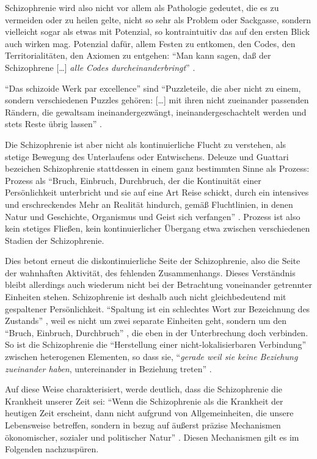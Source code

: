 \documentclass[12pt,
               DIV13,
               paper=a4,
               twoside=false,
               onehalfspacing,
               bibliography=totoc,
               toc=graduated,
               draft,
               ]{scrartcl}
\newcommand{\lips}{\dots\unkern}
\newcommand{\pc}[2]{\parencite[#1]{#2}}
\newcommand{\dg}{Deleuze und Guattari\xspace}
\begin{document}
Schizophrenie wird also nicht vor allem als Pathologie gedeutet, die
es zu vermeiden oder zu heilen gelte, nicht so sehr als Problem oder
Sackgasse, sondern vielleicht sogar als etwas mit Potenzial, so
kontraintuitiv das auf den ersten Blick auch wirken mag. Potenzial
dafür, allem Festen zu entkomen, den Codes, den Territorialitäten, den
Axiomen zu entgehen: "`Man kann sagen, daß der Schizophrene [\lips] \emph{alle Codes
durcheinanderbringt}"' \pc{S. 22, Hervorh. im Orig.}{ao}.

"`Das schizoide Werk par excellence"' \pc{54}{ao} sind "`Puzzleteile,
die aber nicht zu einem, sondern verschiedenen Puzzles gehören:
[\lips] mit ihren nicht zueinander passenden Rändern, die gewaltsam
ineinandergezwängt, ineinandergeschachtelt werden und stets Reste
übrig lassen"' \pc{54}{ao}.

Die Schizophrenie ist aber nicht als kontinuierliche Flucht zu
verstehen, als stetige Bewegung des Unterlaufens oder Entwischens. \dg
bezeichen Schizophrenie stattdessen in einem ganz bestimmten Sinne als
Prozess: Prozess als "`Bruch, Einbruch, Durchbruch, der die Kontinuität einer
Persönlichkeit unterbricht und sie auf eine Art Reise schickt, durch
ein intensives und erschreckendes \glq Mehr an Realität\grq{}
hindurch, gemäß Fluchtlinien, in denen Natur und Geschichte,
Organismus und Geist sich verfangen"' \pc{28}{schizg}. Prozess ist
also kein stetiges Fließen, kein kontinuierlicher Übergang etwa
zwischen verschiedenen Stadien der Schizophrenie.

Dies betont erneut die diskontinuierliche Seite der Schizophrenie,
also die Seite der wahnhaften Aktivität, des fehlenden Zusammenhangs.
Dieses Verständnis bleibt allerdings auch wiederum nicht bei der
Betrachtung voneinander getrennter Einheiten stehen. Schizophrenie ist
deshalb auch nicht gleichbedeutend mit gespaltener Persönlichkeit.
"`Spaltung ist ein schlechtes Wort zur Bezeichnung des Zustands"'
\pc{27}{schizg}, weil es nicht um zwei separate Einheiten geht,
sondern um den "`Bruch, Einbruch, Durchbruch"' \pc{28}{schizg}, die
eben in der Unterbrechung doch verbinden. So ist die Schizophrenie die
"`Herstellung einer nicht-lokalisierbaren Verbindung"' \pc{19}{schizg}
zwischen heterogenen Elementen, so dass sie, "`\emph{gerade weil sie
keine Beziehung zueinander haben}, untereinander in Beziehung treten"'
\pc{19}{schizg}.

Auf diese Weise charakterisiert, werde deutlich, dass die
Schizophrenie die Krankheit unserer Zeit sei: "`Wenn die Schizophrenie
als die Krankheit der heutigen Zeit erscheint, dann nicht aufgrund von
Allgemeinheiten, die unsere Lebensweise betreffen, sondern in bezug
auf äußerst präzise Mechanismen ökonomischer, sozialer und politischer
Natur"' \pc{28}{schizg}. Diesen Mechanismen gilt es im Folgenden
nachzuspüren.
\end{document}
